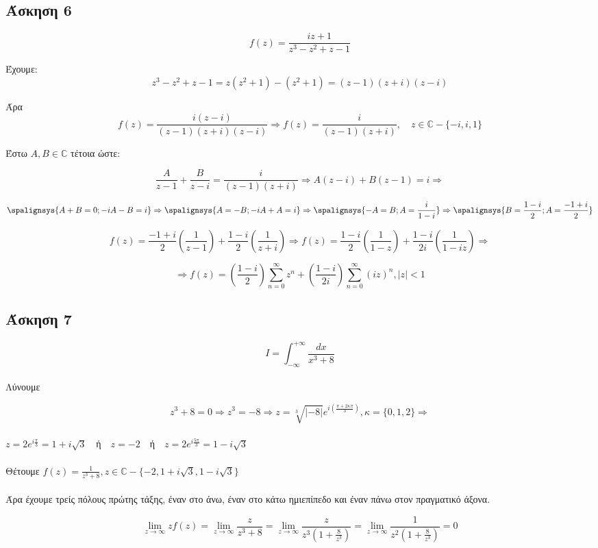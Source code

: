 \documentclass[12pt]{article}
\begin{document}
 \subsection{Άσκηση 6}

$$ f(z)=\frac{iz+1}{z^3-z^2+z-1} $$

Έχουμε:
$$ z^3-z^2+z-1=z(z^2+1)-(z^2+1)=(z-1)(z+i)(z-i) $$

Άρα 
$$ f(z)=\frac{i(z-i)}{(z-1)(z+i)(z-i)} \Rightarrow f(z)=\frac{i}{(z-1)(z+i)} , \quad z \in \mathbb{C}-\{-i,i,1\} $$

Έστω $A,B\in\mathbb{C}$ τέτοια ώστε:

$$ \frac{A}{z-1}+\frac{B}{z-i}= \frac{i}{(z-1)(z+i)} \Rightarrow A(z-i)+B(z-1)=i \Rightarrow$$


\[
\spalignsys{A+B=0;-iA-B=i} \Rightarrow \spalignsys{A=-B;-iA+A=i}\Rightarrow \spalignsys{-A=B;A=\frac{i}{1-i} }\Rightarrow \spalignsys{ B=\frac{1-i}{2};A=\frac{-1+i}{2}}
\]

$$ f(z)= \frac{-1+i}{2} \left( \frac{1}{z-1} \right)  + \frac{1-i}{2} \left( \frac{1}{z+i} \right)\Rightarrow f(z)= \frac{1-i}{2} \left( \frac{1}{1-z} \right)  + \frac{1-i}{2i} \left( \frac{1}{1-iz} \right)\Rightarrow  $$

$$ \Rightarrow f(z)= \left(\frac{1-i}{2}\right) \sum_{n=0}^{\infty}{z^n}  + \left(\frac{1-i}{2i} \right) \sum_{n=0}^{\infty}{(iz)^n} ,|z|<1$$

 \subsection{Άσκηση 7}

$$I= \int_{-\infty}^{+\infty} \frac{dx}{x^3+8}$$
\\ Λύνουμε

$$ z^3+8=0 \Rightarrow z^3=-8 \Rightarrow
z=\sqrt[3]{|-8|}e^{i \left(\frac{\pi + 2\kappa \pi}{3} \right) } , \kappa=\{0,1,2\}\Rightarrow $$
\\
$ z=2e^{i\frac{\pi}{3}}= 1+i\sqrt{3} \quad $ή$ \quad z=-2 \quad $ή$ \quad z=2e^{i\frac{5\pi}{3}}=1-i\sqrt{3} $
\\
\\
Θέτουμε $ f(z)=\frac{1}{z^3+8},z\in\mathbb{C}-\{-2, 1+i\sqrt{3},1-i\sqrt{3}\} $
\\ \\
Άρα έχουμε τρείς πόλους πρώτης τάξης, έναν στο άνω, έναν στο κάτω ημιεπίπεδο και έναν πάνω στον πραγματικό άξονα.

$$ \lim_{z \to \infty } zf(z)=\lim_{z \to \infty } \frac{z}{z^3+8}=
\lim_{z \to \infty } \frac{z}{z^3\left(1+\frac{8}{z^3}\right)}=
\lim_{z \to \infty } \frac{1}{z^2\left(1+\frac{8}{z^3}\right)} =0$$
\end{document}
